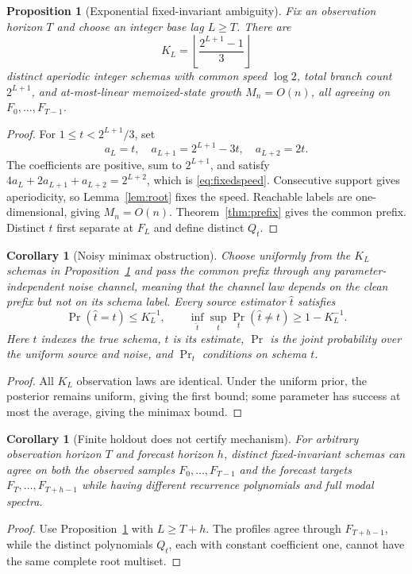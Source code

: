 \documentclass[10pt,twocolumn]{article}
\theoremstyle{cleanprop}
\newtheorem{proposition}[theorem]{Proposition}
\newtheorem{corollary}[theorem]{Corollary}
\begin{document}
\begin{proposition}[Exponential fixed-invariant ambiguity]\label{prop:family}
Fix an observation horizon $T$ and choose an integer base lag $L\ge T$. There
are
\[
K_L=\left\lfloor\frac{2^{L+1}-1}{3}\right\rfloor
\]
distinct aperiodic integer schemas with common speed $\log2$, total branch
count $2^{L+1}$, and at-most-linear memoized-state growth $M_n=O(n)$, all
agreeing on
$F_0,\ldots,F_{T-1}$.
\end{proposition}
\begin{proof}
For $1\le t<2^{L+1}/3$, set
\[
a_L=t,\quad a_{L+1}=2^{L+1}-3t,\quad a_{L+2}=2t.
\]
The coefficients are positive, sum to $2^{L+1}$, and satisfy
$4a_L+2a_{L+1}+a_{L+2}=2^{L+2}$, which is
\eqref{eq:fixedspeed}. Consecutive support gives aperiodicity, so
Lemma~\ref{lem:root} fixes the speed. Reachable labels are one-dimensional,
giving $M_n=O(n)$. Theorem~\ref{thm:prefix} gives the common prefix. Distinct
$t$ first separate at $F_L$ and define distinct $Q_t$.
\end{proof}

\begin{corollary}[Noisy minimax obstruction]\label{cor:minimax}
Choose uniformly from the $K_L$ schemas in Proposition~\ref{prop:family} and
pass the common prefix through any parameter-independent noise channel, meaning
that the channel law depends on the clean prefix but not on its schema label.
Every source estimator $\widehat t$ satisfies
\[
\Pr(\widehat t=t)\le K_L^{-1},\qquad
\inf_{\widehat t}\sup_t\Pr_t(\widehat t\ne t)\ge1-K_L^{-1}.
\]
Here $t$ indexes the true schema, $\widehat t$ is its estimate, $\Pr$ is the
joint probability over the uniform source and noise, and $\Pr_t$ conditions on
schema $t$.
\end{corollary}
\begin{proof}
All $K_L$ observation laws are identical. Under the uniform prior, the
posterior remains uniform, giving the first bound; some parameter has success
at most the average, giving the minimax bound.
\end{proof}

\begin{corollary}[Finite holdout does not certify mechanism]\label{cor:holdout}
For arbitrary observation horizon $T$ and forecast horizon $h$, distinct
fixed-invariant schemas can agree on both the observed samples
$F_0,\ldots,F_{T-1}$ and the forecast targets
$F_T,\ldots,F_{T+h-1}$ while having different recurrence polynomials and full
modal spectra.
\end{corollary}
\begin{proof}
Use Proposition~\ref{prop:family} with $L\ge T+h$. The profiles agree through
$F_{T+h-1}$, while the distinct polynomials $Q_t$, each with constant
coefficient one, cannot have the same complete root multiset.
\end{proof}
\end{document}

